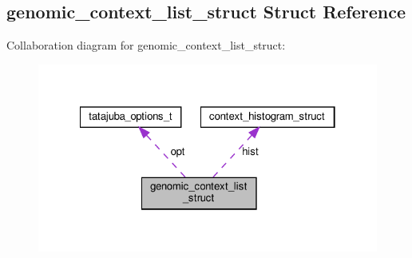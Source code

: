 \hypertarget{structgenomic__context__list__struct}{}\subsection{genomic\+\_\+context\+\_\+list\+\_\+struct Struct Reference}
\label{structgenomic__context__list__struct}


Collaboration diagram for genomic\+\_\+context\+\_\+list\+\_\+struct\+:\nopagebreak
\begin{figure}[H]
\begin{center}
\leavevmode
\includegraphics[width=322pt]{structgenomic__context__list__struct__coll__graph}
\end{center}
\end{figure}
